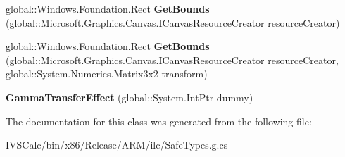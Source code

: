 \begin{DoxyCompactItemize}
global\+::\+Windows.\+Foundation.\+Rect {\bfseries Get\+Bounds} (global\+::\+Microsoft.\+Graphics.\+Canvas.\+I\+Canvas\+Resource\+Creator resource\+Creator)
\item 
\mbox{\label{class_microsoft_1_1_graphics_1_1_canvas_1_1_effects_1_1_gamma_transfer_effect_aa2d831514986da053da0423c9f99c841}} 
global\+::\+Windows.\+Foundation.\+Rect {\bfseries Get\+Bounds} (global\+::\+Microsoft.\+Graphics.\+Canvas.\+I\+Canvas\+Resource\+Creator resource\+Creator, global\+::\+System.\+Numerics.\+Matrix3x2 transform)
\item 
\mbox{\label{class_microsoft_1_1_graphics_1_1_canvas_1_1_effects_1_1_gamma_transfer_effect_acc80116adac830c588156332a0cbd9ec}} 
{\bfseries Gamma\+Transfer\+Effect} (global\+::\+System.\+Int\+Ptr dummy)
\end{DoxyCompactItemize}


The documentation for this class was generated from the following file\+:\begin{DoxyCompactItemize}
\item 
I\+V\+S\+Calc/bin/x86/\+Release/\+A\+R\+M/ilc/Safe\+Types.\+g.\+cs\end{DoxyCompactItemize}
